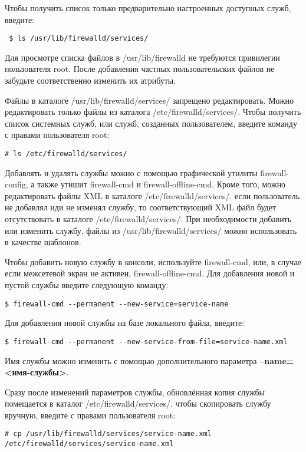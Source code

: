 \documentclass[a4paper,10pt,twoside]{article}
\begin{document}
Чтобы получить список только предварительно настроенных доступных служб, введите:
\begin{verbatim}
 $ ls /usr/lib/firewalld/services/
\end{verbatim} 


Для просмотре списка файлов в /usr/lib/firewalld не требуются привилегии пользователя root. После добавления частных пользовательских файлов не забудьте соответственно изменить их атрибуты.

Файлы в каталоге /usr/lib/firewalld/services/ запрещено редактировать. Можно редактировать только файлы из каталога /etc/firewalld/services/. Чтобы получить список системных служб, или служб, созданных пользователем, введите команду с правами пользователя root: 
\begin{verbatim}
# ls /etc/firewalld/services/
\end{verbatim} 

Добавлять и удалять службы можно с помощью графической утилиты firewall-config, а также утишит firewall-cmd и firewall-offline-cmd. Кроме того, можно редактировать файлы XML в каталоге /etc/firewalld/services/. если пользователь не добавлял иди не изменял службу, то соответствующий XML файл будет отсутствовать в каталоге /etc/firewalld/services/. При необходимости  добавить или изменить службу, файлы из /usr/lib/firewalld/services/ можно использовать в качестве шаблонов.

Чтобы добавить новую службу в консоли, используйте firewall-cmd, или, в случае если межсетевой экран не активен, firewall-offline-cmd. Для добавления новой и пустой службы введите следующую команду:
\begin{verbatim}
$ firewall-cmd --permanent --new-service=service-name
\end{verbatim} 

Для добавления новой службы на базе локального файла, введите:
\begin{verbatim}
$ firewall-cmd --permanent --new-service-from-file=service-name.xml
\end{verbatim} 

Имя службы можно изменить с помощью дополнительного параметра \textbf{--name=<имя-службы>}.

Сразу после изменений параметров службы, обновлённая копия службы помещается в каталог /etc/firewalld/services/. чтобы скопировать службу вручную, введите с правами пользователя root: 
\begin{verbatim}
# cp /usr/lib/firewalld/services/service-name.xml /etc/firewalld/services/service-name.xml                                                                                          \end{verbatim} 
\end{document}
